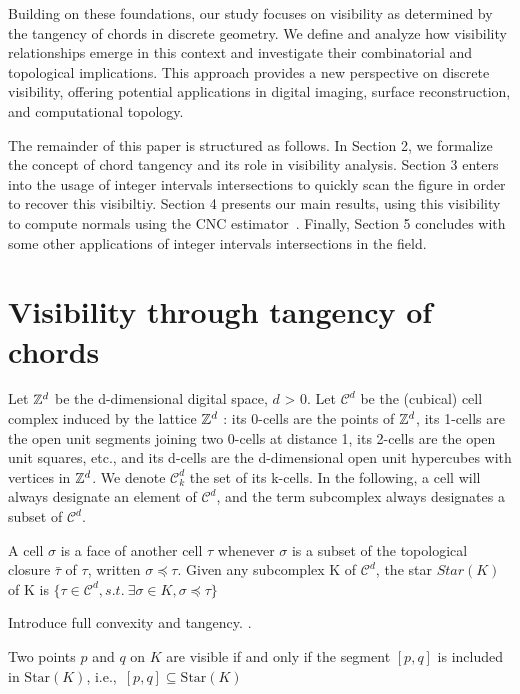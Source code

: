\documentclass[runningheads]{llncs}
\begin{document}
    Building on these foundations, our study focuses on visibility as determined by the tangency of chords in discrete geometry.
    We define and analyze how visibility relationships emerge in this context and investigate their combinatorial and topological implications.
    This approach provides a new perspective on discrete visibility, offering potential applications in digital imaging, surface reconstruction, and computational topology.

    The remainder of this paper is structured as follows.
    In Section 2, we formalize the concept of chord tangency and its role in visibility analysis.
    Section 3 enters into the usage of integer intervals intersections to quickly scan the figure in order to recover this visibiltiy.
    Section 4 presents our main results, using this visibility to compute normals using the CNC estimator~\cite{lachaud:2022-dcg}.
    Finally, Section 5 concludes with some other applications of integer intervals intersections in the field.




    \section{Visibility through tangency of chords}


    Let $\mathbb{Z}^d$ be the d-dimensional digital space, $d$ > 0.
    Let $\mathcal{C}^d$ be the (cubical) cell complex induced by the lattice $\mathbb{Z}^d$ : its 0-cells are the points of $\mathbb{Z}^d$, its 1-cells are the open unit segments joining two 0-cells at distance 1, its 2-cells are the open unit squares, etc., and its d-cells are the d-dimensional open unit hypercubes with vertices in $\mathbb{Z}^d$.
    We denote $\mathcal{C}^d_k$ the set of its k-cells.
    In the following, a cell will always designate an element of $\mathcal{C}^d$, and the term subcomplex always designates a subset of $\mathcal{C}^d$.

    A cell $\sigma$ is a face of another cell $\tau$ whenever $\sigma$ is a subset of the topological closure $\bar{\tau}$ of $\tau$, written $\sigma \preccurlyeq \tau$.
    Given any subcomplex K of $\mathcal{C}^d$, the star $Star(K)$ of K is $\{\tau \in \mathcal{C}^d, s.t.\ \exists\sigma \in K,\sigma \preccurlyeq \tau\}$


    Introduce full convexity and tangency. \cite{lachaud:2021-dgmm,lachaud:2022-jmiv}.

    \begin{definition}
        Two points \( p \) and \( q \) on \( K \) are visible if and only if the segment \([p, q]\) is included in \(\text{Star}(K)\), i.e.,\ \( [p, q] \subseteq \text{Star}(K)\)
    \end{definition}
\end{document}

